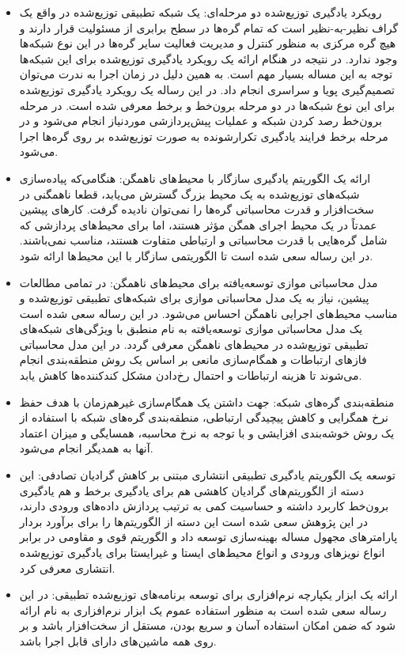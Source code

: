 \begin{itemize}
	\item
	رویکرد یادگیری توزیع‌شده دو مرحله‌ای: یک شبکه‌ تطبیقی توزیع‌شده در واقع یک گراف نظیر-به-نظیر است که تمام گره‌ها در سطح برابری از مسئولیت قرار دارند و هیچ گره مرکزی به منظور کنترل و مدیریت فعالیت سایر گره‌ها در این نوع شبکه‌ها وجود ندارد. در نتیجه در هنگام ارائه یک رویکرد یادگیری توزیع‌شده برای این شبکه‌ها توجه به این مساله بسیار مهم است. به همین دلیل در زمان اجرا به ندرت می‌توان تصمیم‌گیری پویا و سراسری انجام داد. در این رساله یک رویکرد یادگیری توزیع‌شده برای این نوع شبکه‌ها در دو مرحله برون‌خط و برخط معرفی شده است. در مرحله برون‌خط رصد کردن شبکه و عملیات پیش‌پردازشی موردنیاز انجام می‌شود و در مرحله برخط فرایند یادگیری تکرارشونده به صورت توزیع‌شده بر روی گره‌ها اجرا می‌شود.
	\item 
	ارائه یک الگوریتم یادگیری سازگار با محیط‌های ناهمگن: هنگامی‌که پیاده‌سازی شبکه‌های توزیع‌شده به یک محیط بزرگ گسترش می‌یابد، قطعا ناهمگنی در سخت‌افزار و قدرت محاسباتی گره‌ها را نمی‌توان نادیده گرفت. کارهای پیشین عمدتاً در یک محیط اجرای همگن مؤثر هستند، اما برای محیط‌های پردازشی که شامل گره‌هایی با قدرت محاسباتی و ارتباطی متفاوت هستند، مناسب نمی‌باشند. در این رساله سعی شده است تا الگوریتمی سازگار با این محیط‌ها ارائه شود.
	\item
	مدل محاسباتی موازی توسعه‌یافته برای محیط‌های ناهمگن: در تمامی مطالعات پیشین، نیاز به یک مدل محاسباتی موازی برای شبکه‌های تطبیقی توزیع‌شده و مناسب محیط‌های اجرایی ناهمگن احساس می‌شود. در این رساله سعی شده است یک مدل محاسباتی موازی توسعه‌یافته به نام  منطبق با ویژگی‌های شبکه‌های تطبیقی توزیع‌شده در محیط‌های ناهمگن معرفی گردد. در این مدل محاسباتی فازهای ارتباطات و همگام‌سازی مانعی بر اساس یک روش منطقه‌بندی‌ انجام می‌شوند تا هزینه ارتباطات و احتمال رخ‌دادن مشکل کندکننده‌ها کاهش یابد.
	\item
	منطقه‌بندی گره‌های شبکه: جهت داشتن یک همگام‌سازی غیرهم‌زمان با هدف حفظ نرخ همگرایی و کاهش پیچیدگی ارتباطی، منطقه‌بندی گره‌های شبکه با استفاده از یک روش خوشه‌بندی افزایشی و با توجه به نرخ محاسبه، همسایگی و میزان اعتماد آنها به همدیگر انجام می‌شود. 
	\item
	توسعه یک الگوریتم یادگیری تطبیقی انتشاری مبتنی بر کاهش گرادیان تصادفی: این دسته از الگوریتم‌های گرادیان کاهشی هم برای یادگیری برخط و هم یادگیری برون‌خط کاربرد داشته و حساسیت کمی به ترتیب پردازش داد‌ه‌های ورودی دارند، در این پژوهش سعی شده است این دسته از الگوریتم‌ها را برای برآورد بردار پارامترهای مجهول مساله بهینه‌سازی توسعه داد و الگوریتم قوی و مقاومی در برابر انواع نویزهای ورودی و انواع محیط‌های ایستا و غیرایستا برای یادگیری توزیع‌شده انتشاری معرفی کرد. 
	\item 
	ارائه یک ابزار یکپارچه نرم‌افزاری برای توسعه برنامه‌های توزیع‌شده تطبیقی: در این رساله سعی شده است به منظور استفاده عموم یک ابزار نرم‌افزاری به نام  ارائه شود که ضمن امکان استفاده آسان و سریع بودن، مستقل از سخت‌افزار باشد و بر روی همه ماشین‌های دارای  قابل اجرا باشد. 
\end{itemize}


